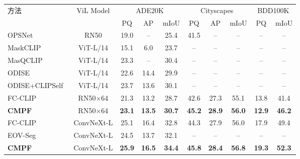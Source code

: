 \begin{table}[!htbp]\centering
    \vspace{0.5em}\centering\wuhao
    \begin{tabular}{lccccccccc}
        \toprule
        \multirow{2}{*}{方法} & \multirow{2}{*}{ViL Model} & \multicolumn{3}{c}{ADE20K} & \multicolumn{3}{c}{Cityscapes} & \multicolumn{2}{c}{BDD100K} \\
        \cline{3-10}
         &       & PQ & AP & mIoU & PQ & AP & mIoU & PQ & mIoU \\
        \midrule
        OPSNet~\cite{chen2023open}    & RN50        & 19.0 & --   & 25.4 & 41.5 & --   & --   & --   & --   \\
        MaskCLIP~\cite{ding2023open}  & ViT-L/14    & 15.1 & 6.0  & 23.7 & --   & --   & --   & --   & --   \\
        MasQCLIP~\cite{MasQCLIP} & ViT-L/14    & 23.3 & --   & 30.4 & --   & --   & --   & --   & --   \\
        ODISE~\cite{xu2023open}        & ViT-L/14    & 22.6 & 14.4 & 29.9 & --   & --   & --   & --   & --   \\
        ODISE+CLIPSelf~\cite{wu2024clipself} & ViT-L/14 & 23.7 & 13.6 & 30.1 & -- & -- & -- & -- & -- \\
        \midrule
        FC-CLIP~\cite{yu2023convolutions} & RN50$\times$64 & 21.3 & 13.2 & 28.7 & 42.6 & 27.3 & 55.1 & 13.8 & 41.4 \\
        \textbf{CMPF}                & RN50$\times$64 & \textbf{23.1} & \textbf{13.5} & \textbf{30.7} & \textbf{45.2} & \textbf{28.9} & \textbf{56.0} & \textbf{12.9} & \textbf{46.2} \\
        \midrule
        FC-CLIP~\cite{yu2023convolutions} & ConvNeXt-L & 25.1 & 16.4 & 32.8 & 44.3 & 27.9 & 56.0 & 17.9 & 49.4 \\
        EOV-Seg~\cite{niu2025eov}     & ConvNeXt-L  & 24.5 & 13.7 & 32.1 & --   & --   & --   & --   & --   \\
        \textbf{CMPF}                & ConvNeXt-L  & \textbf{25.9} & \textbf{16.5} & \textbf{34.4} & \textbf{45.8} & \textbf{28.4} & \textbf{56.8} & \textbf{19.3} & \textbf{52.3} \\
        \bottomrule
    \end{tabular}
\end{table}
